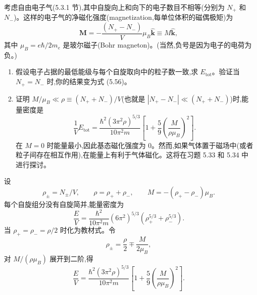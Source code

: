 \begin{question}
考虑自由电子气(5.3.1 节),其中自旋向上和向下的电子数目不相等(分别为 $N_+$ 和 $N_-$)。这样的电子气的净磁化强度(magnetization,每单位体积的磁偶极矩)为
\[
\mathbf M=-\frac{(N_+-N_-)}{V}\mu_B\hat{\mathbf k}\equiv M\hat{\mathbf k},
\]
其中 $\mu_B=e\hbar/2m_e$ 是玻尔磁子(Bohr magneton)。(当然,负号是因为电子的电荷为负。)
\begin{enumerate}
\item 假设电子占据的最低能级与每个自旋取向中的粒子数一致,求 $E_{\mathrm{tot}}$。验证当 $N_+=N_-$ 时,你的结果变为式 (5.56)。
\item 证明 $M/\mu_B\ll\rho\equiv(N_++N_-)/V$(也就是 $|N_+-N_-|\ll(N_++N_-)$)时,能量密度是
\[
\frac{1}{V}E_{\mathrm{tot}}=\frac{\hbar^2(3\pi^2\rho)^{5/3}}{10\pi^2m}
\left[1+\frac{5}{9}\left(\frac{M}{\rho\mu_B}\right)^2\right].
\]
在 $M=0$ 时能量最小,因此基态磁化强度为 0。然而,如果气体置于磁场中(或者粒子间存在相互作用),在能量上有利于气体磁化。这将在习题 5.33 和 5.34 中进行探讨。
\end{enumerate}

\par\smallskip
{}

\end{question}
\begin{solution}

设
\[
\rho_\pm=N_\pm/V,
\qquad \rho=\rho_++\rho_-,
\qquad M=-(\rho_+-\rho_-)\mu_B.
\]
每个自旋组分没有自旋简并,能量密度为
\[
\frac{E}{V}=\frac{\hbar^2}{10\pi^2m}(6\pi^2)^{5/3}
(\rho_+^{5/3}+\rho_-^{5/3}).
\]
当 $\rho_+=\rho_-=\rho/2$ 时化为教材式。令
\[
\rho_\pm=\frac\rho2\mp\frac{M}{2\mu_B},
\]
对 $M/(\rho\mu_B)$ 展开到二阶,得
\[
\frac{E}{V}=\frac{\hbar^2(3\pi^2\rho)^{5/3}}{10\pi^2m}
\left[1+\frac59\left(\frac{M}{\rho\mu_B}\right)^2\right].
\]

\end{solution}

